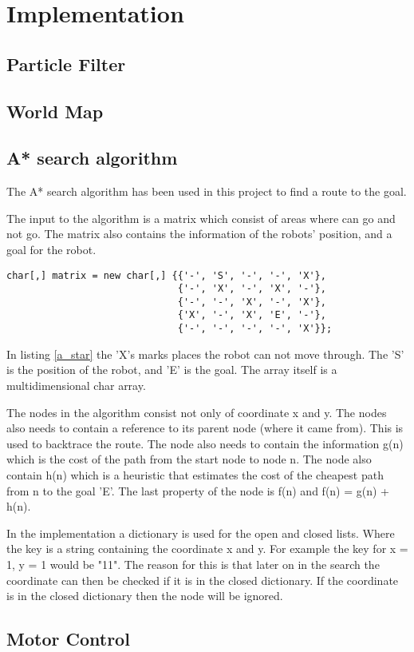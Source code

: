 \chapter{Implementation}
\label{chp:impl}

\section{Particle Filter}
\section{World Map}
\section{A* search algorithm}

The A* search algorithm has been used in this project to find a route to the goal. 

The input to the algorithm is a matrix which consist of areas where  can go and not go. The matrix also contains the information of the robots' position, and a goal for the robot.

\begin{lstlisting}[caption={An example of the matrix which the A* uses as input.}, label=a_star]
char[,] matrix = new char[,] {{'-', 'S', '-', '-', 'X'},
							  {'-', 'X', '-', 'X', '-'},
							  {'-', '-', 'X', '-', 'X'},
							  {'X', '-', 'X', 'E', '-'},
							  {'-', '-', '-', '-', 'X'}};
\end{lstlisting}

In listing \ref{a_star} the 'X's marks places the robot can not move through. The 'S' is the position of the robot, and 'E' is the goal. The array itself is a multidimensional char array.

The nodes in the algorithm consist not only of coordinate x and y. The nodes also needs to contain a reference to its parent node (where it came from). This is used to backtrace the route. The node also needs to contain the information g(n) which is the cost of the path from the start node to node n. The node also contain h(n) which is a heuristic that estimates the cost of the cheapest path from n to the goal 'E'. The last property of the node is f(n) and f(n) = g(n) + h(n).

In the implementation a dictionary is used for the open and closed lists. Where the key is a string containing the coordinate x and y. For example the key for x = 1, y = 1 would be "11". The reason for this is that later on in the search the coordinate can then be checked if it is in the closed dictionary. If the coordinate is in the closed dictionary then the node will be ignored.



\section{Motor Control}

